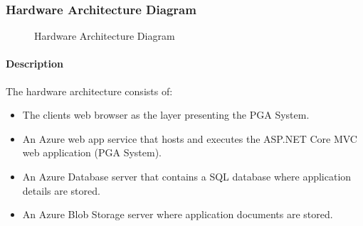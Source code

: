 \documentclass[11pt]{article}
\begin{document}
\subsubsection{Hardware Architecture Diagram}
\begin{figure}[H]
	\caption{Hardware Architecture Diagram}
\end{figure}
\paragraph{Description}
The hardware architecture consists of:

\begin{itemize}
\item The clients web browser as the layer presenting the PGA System.
\item An Azure web app service that hosts and executes the ASP.NET Core MVC web application (PGA System).
\item An Azure Database server that contains a SQL database where application details are stored. 
\item An Azure Blob Storage server where application documents are stored.

\end{itemize}
\end{document}
